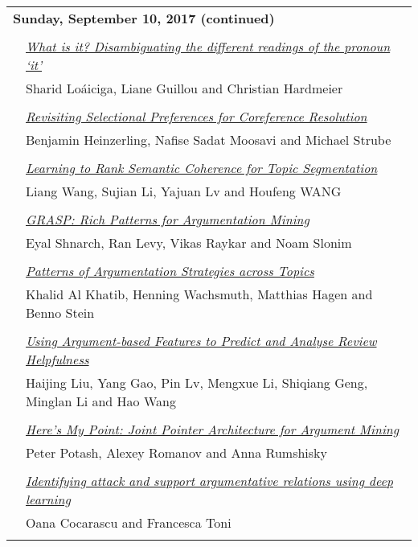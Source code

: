 \begin{tabular}{p{20mm}p{128mm}}
\\
\multicolumn{2}{l}{\bf Sunday, September 10, 2017 (continued)} \\\\
 & \hyperlink{page.1334}{\em What is it? Disambiguating the different readings of the pronoun ‘it’}\\
         & Sharid Lo\'{a}iciga, Liane Guillou and Christian Hardmeier \\
\\

 & \hyperlink{page.1341}{\em Revisiting Selectional Preferences for Coreference Resolution}\\
         & Benjamin Heinzerling, Nafise Sadat Moosavi and Michael Strube \\
\\

 & \hyperlink{page.1349}{\em Learning to Rank Semantic Coherence for Topic Segmentation}\\
         & Liang Wang, Sujian Li, Yajuan Lv and Houfeng WANG \\
\\

 & \hyperlink{page.1354}{\em GRASP: Rich Patterns for Argumentation Mining}\\
         & Eyal Shnarch, Ran Levy, Vikas Raykar and Noam Slonim \\
\\

 & \hyperlink{page.1360}{\em Patterns of Argumentation Strategies across Topics}\\
         & Khalid Al Khatib, Henning Wachsmuth, Matthias Hagen and Benno Stein \\
\\

 & \hyperlink{page.1367}{\em Using Argument-based Features to Predict and Analyse Review Helpfulness}\\
         & Haijing Liu, Yang Gao, Pin Lv, Mengxue Li, Shiqiang Geng, Minglan Li and Hao Wang \\
\\

 & \hyperlink{page.1373}{\em Here's My Point: Joint Pointer Architecture for Argument Mining}\\
         & Peter Potash, Alexey Romanov and Anna Rumshisky \\
\\

 & \hyperlink{page.1383}{\em Identifying attack and support argumentative relations using deep learning}\\
         & Oana Cocarascu and Francesca Toni \\
\\

\end{tabular}
